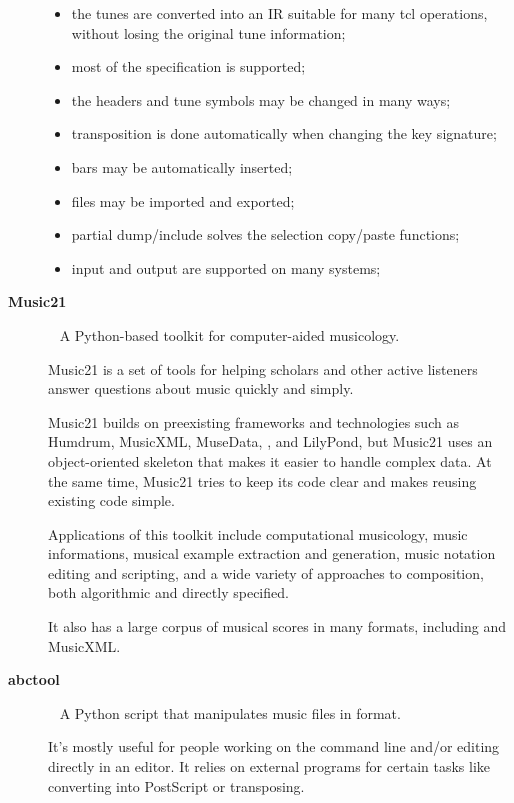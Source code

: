 \begin{description}
    \begin{itemize}
      \item the \abc{} tunes are converted into an \ac{IR} suitable for many tcl operations, without
      losing the original tune information;
      \item most of the \abc{} specification is supported;
      \item the headers and tune symbols may be changed in many ways;
      \item transposition is done automatically when changing the key signature;
      \item bars may be automatically inserted;
      \item \midi{} files may be imported and exported;
      \item partial dump/include solves the selection copy/paste functions;
      \item \midi{} input and output are supported on many systems;
    \end{itemize}

  \item[\textbf{Music21}]~\cite{music21:Online}
    A Python-based toolkit for computer-aided musicology.

    Music21 is a set of tools for helping scholars and other active listeners answer questions about
    music quickly and simply.

    Music21 builds on preexisting frameworks and technologies such as Humdrum, MusicXML, MuseData,
    \midi{}, and LilyPond, but Music21 uses an object-oriented skeleton that makes it easier to
    handle complex data. At the same time, Music21 tries to keep its code clear and makes reusing
    existing code simple.

    Applications of this toolkit include computational musicology, music informations, musical
    example extraction and generation, music notation editing and scripting, and a wide variety of
    approaches to composition, both algorithmic and directly specified.

    It also has a large corpus of musical scores in many formats, including \abc{} and MusicXML.

  \item[\textbf{abctool}]~\cite{abctool:Online}
    A Python script that manipulates music files in \abc{} format.

    It's mostly useful for people working on the command line and/or editing \abc{} directly in an
    editor. It relies on external programs for certain tasks like converting into PostScript or
    transposing.


\end{description}
